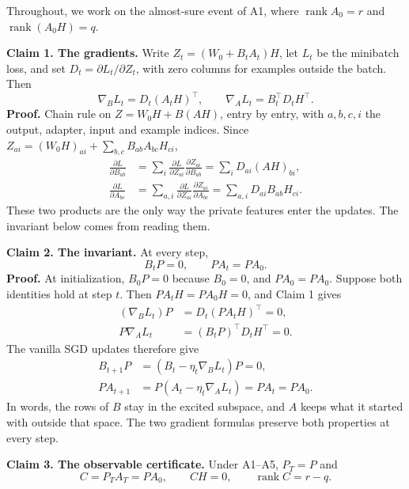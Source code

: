 \documentclass[11pt,a4paper]{article}
\newcommand{\block}[1]{\par\vspace{5pt}{\color{ink}\bfseries #1}\par\vspace{2pt}}
\newcommand{\rank}{\operatorname{rank}}
\begin{document}
\newpage
\begingroup
\setlength{\parskip}{4pt}
\setlength{\abovedisplayskip}{5pt}
\setlength{\belowdisplayskip}{5pt}
\setlength{\abovedisplayshortskip}{3pt}
\setlength{\belowdisplayshortskip}{5pt}
\block{4. Three claims}
Throughout, we work on the almost-sure event of A1, where
\(\rank A_0=r\) and \(\rank(A_0H)=q\).

\textbf{Claim 1. The gradients.} Write
\(Z_t=(W_0+B_tA_t)H\), let \(L_t\) be the minibatch loss, and set
\(D_t=\partial L_t/\partial Z_t\), with zero columns for examples outside the batch. Then
\[
\boxed{\nabla_B L_t=D_t(A_tH)^\top,\qquad
\nabla_A L_t=B_t^\top D_tH^\top.}
\]
\textbf{Proof.} Chain rule on \(Z=W_0H+B(AH)\), entry by entry, with
\(a,b,c,i\) the output, adapter, input and example indices.
Since \(Z_{ai}=(W_0H)_{ai}+\sum_{b,c}B_{ab}A_{bc}H_{ci}\),
\[
\begin{aligned}
\frac{\partial L}{\partial B_{ab}}
 &=\sum_i\frac{\partial L}{\partial Z_{ai}}
          \frac{\partial Z_{ai}}{\partial B_{ab}}
 =\sum_iD_{ai}(AH)_{bi},\\[2pt]
\frac{\partial L}{\partial A_{bc}}
 &=\sum_{a,i}\frac{\partial L}{\partial Z_{ai}}
              \frac{\partial Z_{ai}}{\partial A_{bc}}
 =\sum_{a,i}D_{ai}B_{ab}H_{ci}.
\end{aligned}
\]
These two products are the only way the private features enter the updates.
The invariant below comes from reading them.

\textbf{Claim 2. The invariant.} At every step,
\[
\boxed{B_tP=0,\qquad PA_t=PA_0.}
\]
\textbf{Proof.} At initialization, \(B_0P=0\) because \(B_0=0\), and
\(PA_0=PA_0\). Suppose both identities hold at step \(t\).
Then \(PA_tH=PA_0H=0\), and Claim 1 gives
\[
\begin{aligned}
(\nabla_B L_t)P&=D_t(PA_tH)^\top=0,\\
P\nabla_A L_t&=(B_tP)^\top D_tH^\top=0.
\end{aligned}
\]
The vanilla SGD updates therefore give
\[
\begin{aligned}
B_{t+1}P&=(B_t-\eta_t\nabla_B L_t)P=0,\\
PA_{t+1}&=P(A_t-\eta_t\nabla_A L_t)=PA_t=PA_0.
\end{aligned}
\]
In words, the rows of \(B\) stay in the excited subspace, and \(A\) keeps what
it started with outside that space. The two gradient formulas preserve both
properties at every step.

\textbf{Claim 3. The observable certificate.} Under A1--A5, \(P_T=P\) and
\[
\boxed{C=P_TA_T=PA_0,\qquad CH=0,\qquad \rank C=r-q.}
\]
\end{document}
